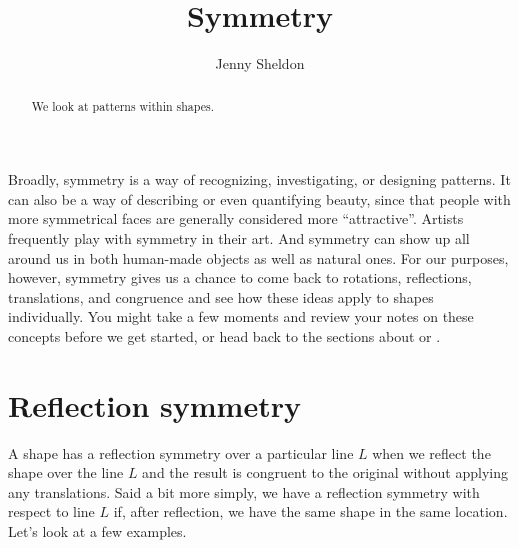 \documentclass{ximera}
\title{Symmetry}
\author{Jenny Sheldon}
\begin{document}
\begin{abstract}
We look at patterns within shapes.
\end{abstract}
\maketitle

Broadly, symmetry is a way of recognizing, investigating, or designing patterns. It can also be a way of describing or even quantifying beauty, since  that people with more symmetrical faces are generally considered more ``attractive''. Artists frequently play with symmetry in their art. And symmetry can show up all around us in both human-made objects as well as natural ones. For our purposes, however, symmetry gives us a chance to come back to rotations, reflections, translations, and congruence and see how these ideas apply to shapes individually. You might take a few moments and review your notes on these concepts before we get started, or head back to the sections about  or .

\section{Reflection symmetry}

A shape has a reflection symmetry over a particular line $L$ when we reflect the shape over the line $L$ and the result is congruent to the original without applying any translations. Said a bit more simply, we have a reflection symmetry with respect to line $L$ if, after reflection, we have the same shape in the same location. Let's look at a few examples.
\end{document}
